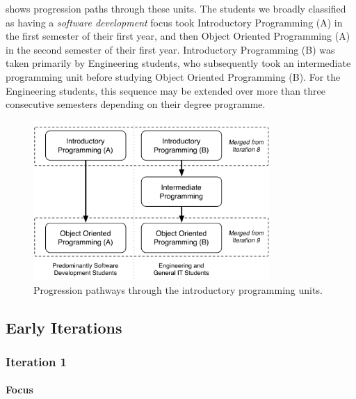  shows progression paths through these units. The students we broadly classified as having a \emph{software development} focus took Introductory Programming (A) in the first semester of their first year, and then Object Oriented Programming (A) in the second semester of their first year. Introductory Programming (B) was taken primarily by Engineering students, who subsequently took an intermediate programming unit before studying Object Oriented Programming (B). For the Engineering students, this sequence may be extended over more than three consecutive semesters depending on their degree programme.

\begin{figure}[htbp]
  \centering
  \includegraphics[width=0.8\textwidth]{UnitPaths}
  \caption{Progression pathways through the introductory programming units.}
  \label{fig:unit_paths}
\end{figure}




\subsection{Early Iterations} %
\label{sub:early_iterations}

\subsubsection{Iteration 1} %
\label{sub:iteration_1}

\paragraph{Focus} %

